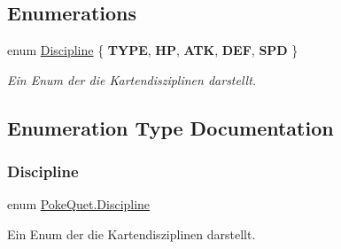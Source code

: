 \subsection*{Enumerations}
\begin{DoxyCompactItemize}
\item 
enum \mbox{\hyperlink{namespace_poke_quet_aa425f1b8cf90847021fe1177d6a7199d}{Discipline}} \{ \newline
{\bfseries T\+Y\+PE}, 
{\bfseries HP}, 
{\bfseries A\+TK}, 
{\bfseries D\+EF}, 
\newline
{\bfseries S\+PD}
 \}
\begin{DoxyCompactList}\small\item\em Ein Enum der die Kartendisziplinen darstellt. \end{DoxyCompactList}\end{DoxyCompactItemize}


\subsection{Enumeration Type Documentation}
\mbox{\label{namespace_poke_quet_aa425f1b8cf90847021fe1177d6a7199d}} 
\subsubsection{\texorpdfstring{Discipline}{Discipline}}
{\footnotesize\ttfamily enum \mbox{\hyperlink{namespace_poke_quet_aa425f1b8cf90847021fe1177d6a7199d}{Poke\+Quet.\+Discipline}}\hspace{0.3cm}{\ttfamily [strong]}}



Ein Enum der die Kartendisziplinen darstellt. 

